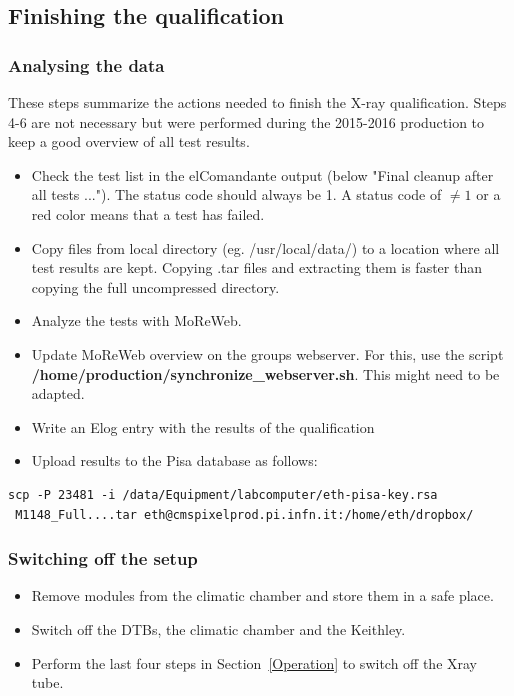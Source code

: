 \documentclass[a4paper,12pt,twoside]{article}
\begin{document}
\subsection{Finishing the qualification}

\subsubsection{Analysing the data}

These steps summarize the actions needed to finish the X-ray qualification. Steps 4-6 are not necessary but were performed during the 2015-2016 production to keep a good overview of all test results.

\begin{itemize}
\item Check the test list in the elComandante output (below "Final cleanup after all tests ..."). The status code should always be 1. A status code of $\neq 1$ or a red color means that a test has failed. 
\item Copy files from local directory (eg. /usr/local/data/) to a location where all test results are kept. Copying .tar files and extracting them is faster than copying the full uncompressed directory. 
\item Analyze the tests with MoReWeb.
\item Update MoReWeb overview on the groups webserver. For this, use the script \textbf{/home/production/synchronize\_webserver.sh}. This might need to be adapted.
\item Write an Elog entry with the results of the qualification
\item Upload results to the Pisa database as follows:
\end{itemize}

\begin{Verbatim}[frame=single]
scp -P 23481 -i /data/Equipment/labcomputer/eth-pisa-key.rsa
 M1148_Full....tar eth@cmspixelprod.pi.infn.it:/home/eth/dropbox/
\end{Verbatim}

\subsubsection{Switching off the setup}

\begin{itemize}
\item Remove modules from the climatic chamber and store them in a safe place.
\item Switch off the DTBs, the climatic chamber and the Keithley.
\item Perform the last four steps in Section~\ref{Operation} to switch off the Xray tube.
\end{itemize}
\end{document}
